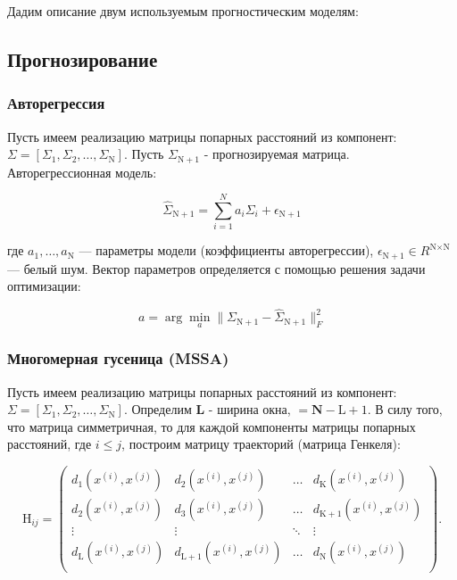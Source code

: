 \documentclass{article}
\begin{document}
Дадим описание двум используемым прогностическим моделям:

\subsection{Прогнозирование}

\subsubsection{Авторегрессия}

Пусть имеем реализацию матрицы попарных расстояний из  компонент: $\Sigma = [\Sigma_1, \Sigma_2, \ldots, \Sigma_\text{N}]$. Пусть $\Sigma_{\text{N} + 1}$ - прогнозируемая матрица. Авторегрессионная модель:

\begin{equation}
    \hat{\Sigma}_{\text{N} + 1} = \sum\limits_{i = 1}^N a_i\Sigma_{i} + \epsilon_{\text{N} + 1}
\end{equation}

где $a_1, \ldots, a_\text{N}$ --- параметры модели (коэффициенты авторегрессии), $\epsilon_{\text{N} + 1} \in R^{\text{N} \times \text{N}}$ --- белый шум. Вектор параметров определяется с помощью решения задачи оптимизации:

\begin{equation}
    a = \arg\min\limits_{a}\|\Sigma_{\text{N} + 1} - \hat{\Sigma}_{\text{N} + 1}\|_F^2
\end{equation}

\subsubsection{Многомерная гусеница (MSSA)}

Пусть имеем реализацию матрицы попарных расстояний из  компонент: $\Sigma = [\Sigma_1, \Sigma_2, \ldots, \Sigma_\text{N}]$. Определим \textbf{L} - ширина окна,  $ = \textbf{N} - \text{L} + 1$. В силу того, что матрица симметричная, то для каждой компоненты матрицы попарных расстояний, где $i \leqslant j$, построим матрицу траекторий (матрица Генкеля):

\begin{equation}
    \text{H}_{ij} = \left(
\begin{array}{cccc}
d_1(x^{(i)}, x^{(j)}) & d_2(x^{(i)}, x^{(j)}) & \ldots & d_{\text{K}}(x^{(i)}, x^{(j)})\\
d_2(x^{(i)}, x^{(j)}) & d_3(x^{(i)}, x^{(j)}) & \ldots & d_{\text{K} + 1}(x^{(i)}, x^{(j)})\\
\vdots & \vdots & \ddots & \vdots\\
d_{\text{L}}(x^{(i)}, x^{(j)}) & d_{\text{L} + 1}(x^{(i)}, x^{(j)}) & \ldots & d_\text{N}(x^{(i)}, x^{(j)})\\
\end{array}
\right).
\end{equation}
\end{document}

